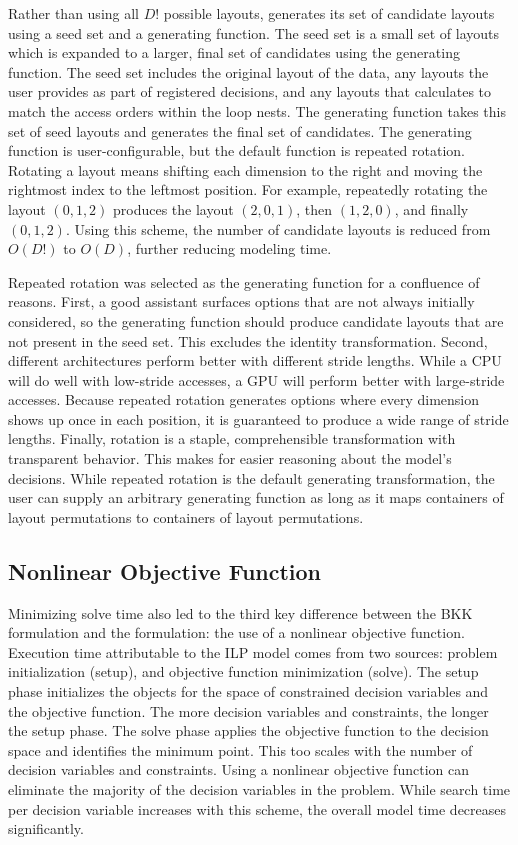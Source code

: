 Rather than using all $D!$ possible layouts, \FormatDecisions{} generates its set of candidate layouts using a seed set and a generating function.
The seed set is a small set of layouts which is expanded to a larger, final set of candidates using the generating function.
The seed set includes the original layout of the data, any layouts the user provides as part of registered decisions, and any layouts that \FormatDecisions{} calculates to match the access orders within the loop nests.
The generating function takes this set of seed layouts and generates the final set of candidates.
The generating function is user-configurable, but the default function is repeated rotation.
Rotating a layout means shifting each dimension to the right and moving the rightmost index to the leftmost position.
For example, repeatedly rotating the layout $(0,1,2)$ produces the layout $(2,0,1)$, then $(1,2,0)$, and finally $(0,1,2)$. 
Using this scheme, the number of candidate layouts is reduced from $O(D!)$ to $O(D)$, further reducing modeling time.

Repeated rotation was selected as the generating function for a confluence of reasons.
First, a good assistant surfaces options that are not always initially considered, so the generating function should produce candidate layouts that are not present in the seed set.
This excludes the identity transformation.
Second, different architectures perform better with different stride lengths.
While a CPU will do well with low-stride accesses, a GPU will perform better with large-stride accesses.
Because repeated rotation generates options where every dimension shows up once in each position, it is guaranteed to produce a wide range of stride lengths.
Finally, rotation is a staple, comprehensible transformation with transparent behavior.
This makes for easier reasoning about the model's decisions.
While repeated rotation is the default generating transformation, the user can supply an arbitrary generating function as long as it maps containers of layout permutations to containers of layout permutations.

\subsection{Nonlinear Objective Function}\label{sec:nonlinearFunc}

Minimizing solve time also led to the third key difference between the BKK formulation and the \FormatDecisions{} formulation: the use of a nonlinear objective function.
Execution time attributable to the ILP model comes from two sources: problem initialization (setup), and objective function minimization (solve).
The setup phase initializes the objects for the space of constrained decision variables and the objective function.
The more decision variables and constraints, the longer the setup phase.
The solve phase applies the objective function to the decision space and identifies the minimum point.
This too scales with the number of decision variables and constraints.
Using a nonlinear objective function can eliminate the majority of the decision variables in the problem.
While search time per decision variable increases with this scheme, the overall model time decreases significantly.

